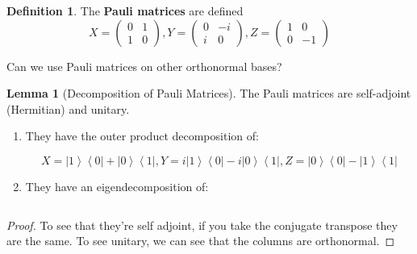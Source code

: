 \documentclass{article}
\newenvironment{question}{\color{blue}}{\ignorespacesafterend}
\newcommand{\ket}[1]{\ensuremath{\left|#1\right\rangle}}
\newcommand{\bra}[1]{\ensuremath{\left\langle#1\right|}}
\theoremstyle{definition}
\newtheorem{lemma}[theorem]{Lemma}
\newtheorem{definition}{Definition}[section]
\begin{document}
      \begin{definition} 
        The \textbf{Pauli matrices} are defined 
          \[
            X = \begin{pmatrix} 0 & 1 \\ 1 & 0 \end{pmatrix},  
            Y = \begin{pmatrix} 0 & -i \\ i & 0 \end{pmatrix},   
            Z = \begin{pmatrix} 1 & 0 \\ 0 & -1 \end{pmatrix}  
          \]
      \end{definition}

      \begin{question}
        Can we use Pauli matrices on other orthonormal bases?  
      \end{question}

      \begin{lemma}[Decomposition of Pauli Matrices]
        The Pauli matrices are self-adjoint (Hermitian) and unitary. 
      
        \begin{enumerate}
          \item They have the outer product decomposition of: 

            \[X = \ket{1} \bra{0} + \ket{0} \bra{1}, Y = i \ket{1} \bra{0} - i \ket{0} \bra{1}, Z = \ket{0} \bra{0} - \ket{1} \bra{1}\]

          \item They have an eigendecomposition of: 

            \[\]

        \end{enumerate}

      \end{lemma}
      \begin{proof}
        To see that they're self adjoint, if you take the conjugate transpose they are the same. To see unitary, we can see that the columns are orthonormal. 
      \end{proof}
\end{document}
